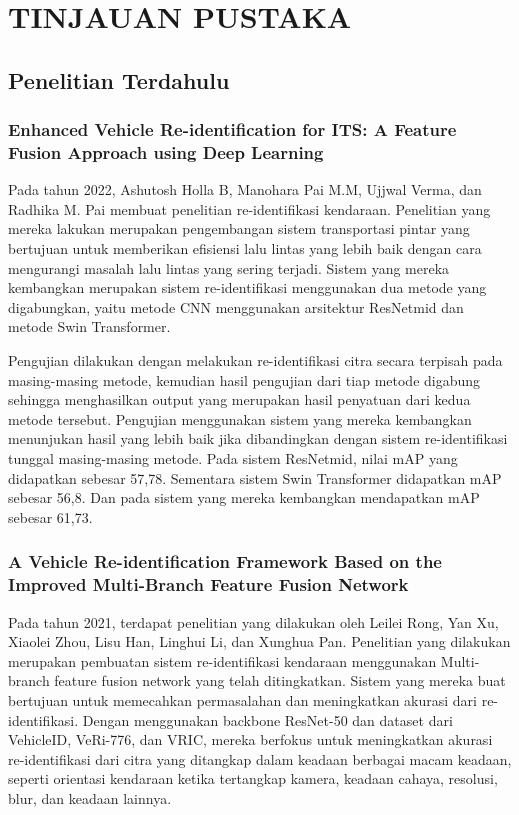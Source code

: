 \chapter{TINJAUAN PUSTAKA}
\label{chap:tinjauanpustaka}

\section{Penelitian Terdahulu}
\label{sec:penelitianterdahulu}

\subsection{Enhanced Vehicle Re-identification for ITS: A Feature Fusion Approach using Deep Learning}

Pada tahun 2022, Ashutosh Holla B, Manohara Pai M.M, Ujjwal Verma, dan Radhika M. Pai membuat penelitian 
re-identifikasi kendaraan. Penelitian yang mereka lakukan merupakan pengembangan sistem transportasi pintar 
yang bertujuan untuk memberikan efisiensi lalu lintas yang lebih baik dengan cara mengurangi masalah lalu 
lintas yang sering terjadi. Sistem yang mereka kembangkan merupakan sistem re-identifikasi menggunakan dua 
metode yang digabungkan, yaitu metode CNN menggunakan arsitektur ResNetmid dan metode Swin Transformer.

Pengujian dilakukan dengan melakukan re-identifikasi citra secara terpisah pada masing-masing metode, 
kemudian hasil pengujian dari tiap metode digabung sehingga menghasilkan output yang merupakan hasil 
penyatuan dari kedua metode tersebut. Pengujian menggunakan sistem yang mereka kembangkan menunjukan hasil 
yang lebih baik jika dibandingkan dengan sistem re-identifikasi tunggal masing-masing metode. Pada sistem 
ResNetmid, nilai mAP yang didapatkan sebesar 57,78. Sementara sistem Swin Transformer didapatkan mAP sebesar 
56,8. Dan pada sistem yang mereka kembangkan mendapatkan mAP sebesar 61,73\parencite{Holla2022}.

\subsection{A Vehicle Re-identification Framework Based on the Improved Multi-Branch Feature Fusion Network}

Pada tahun 2021, terdapat penelitian yang dilakukan oleh Leilei Rong, Yan Xu, Xiaolei Zhou, Lisu Han, Linghui 
Li, dan Xunghua Pan. Penelitian yang dilakukan merupakan pembuatan sistem re-identifikasi kendaraan menggunakan 
Multi-branch feature fusion network yang telah ditingkatkan. Sistem yang mereka buat bertujuan untuk memecahkan 
permasalahan dan meningkatkan akurasi dari re-identifikasi. Dengan menggunakan backbone ResNet-50 dan dataset 
dari VehicleID, VeRi-776, dan VRIC, mereka berfokus untuk meningkatkan akurasi re-identifikasi dari citra yang 
ditangkap dalam keadaan berbagai macam keadaan, seperti orientasi kendaraan ketika tertangkap kamera, keadaan 
cahaya, resolusi, blur, dan keadaan lainnya.

